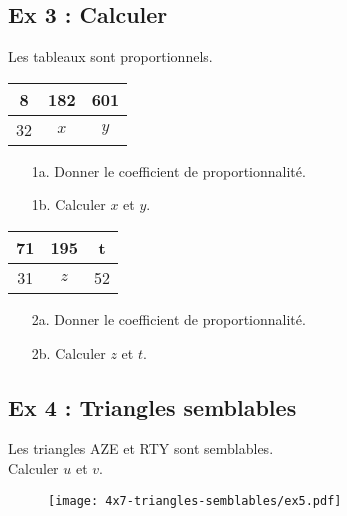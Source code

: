 \subsection*{Ex 3 : Calculer}

Les tableaux sont proportionnels. 

\begin{multicols}{2}
\begin{center}
  \begin{tabular}{|c|c|c|}
    \hline
    8 & 182 & 601 \\  \hline
    32 & $x$ & $y$\\  \hline
  \end{tabular}
\end{center}

\begin{enumerate}
  \item[1a.] Donner le coefficient de proportionnalité.
  \item[1b.] Calculer $x$ et $y$.
  \end{enumerate}

\begin{center}
  \begin{tabular}{|c|c|c|}
    \hline
    71 & 195 & t \\  \hline
    31 & $z$ & 52\\  \hline
  \end{tabular}
\end{center}

\begin{enumerate}
  \item[2a.] Donner le coefficient de proportionnalité.
  \item[2b.] Calculer $z$ et $t$.
  \end{enumerate}
\end{multicols}

\Pointilles[8]

\newpage

\begin{multicols}{2}
\subsection*{Ex 4 : Triangles semblables}

Les triangles AZE et RTY sont semblables.\\ Calculer $u$ et $v$. 

\begin{figure}[H]
  \centering
  \texttt{[image: 4x7-triangles-semblables/ex5.pdf]}
\end{figure}
\end{multicols} 

